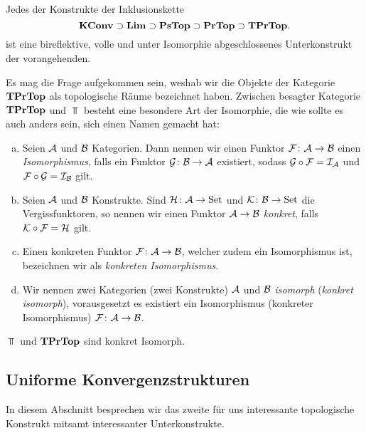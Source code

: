 \begin{prop}
  \label{prop:inklusion}
  Jedes der Konstrukte der Inklusionskette
  $$
  \mathbf{KConv} \supset \mathbf{Lim} \supset \mathbf{PsTop} \supset \mathbf{PrTop} \supset \mathbf{TPrTop}.
  $$
  ist eine bireflektive, volle und unter Isomorphie abgeschlossenes Unterkonstrukt der vorangehenden.
\end{prop}

Es mag die Frage aufgekommen sein, weshab wir die Objekte der Kategorie $\mathbf{TPrTop}$ als topologische Räume bezeichnet haben.
Zwischen besagter Kategorie $\mathbf{TPrTop}$ und $\Top$ besteht eine besondere Art der Isomorphie, die wie sollte es auch anders sein, sich einen Namen gemacht hat:
\begin{defn}
  \begin{enumerate}[a)]
    \item Seien $\mathcal{A}$ und $\mathcal{B}$ Kategorien.
      Dann nennen wir einen Funktor $\mathcal{F} \colon \mathcal{A} \to \mathcal{B}$ einen \emph{Isomorphismus}, falls ein Funktor $\mathcal{G} \colon \mathcal{B} \to \mathcal{A}$ existiert, sodass $\mathcal{G} \circ \mathcal{F} = \mathcal{I}_{\mathcal{A}}$ und $\mathcal{F} \circ \mathcal{G} = \mathcal{I}_{\mathcal{B}}$ gilt.
    \item Seien $\mathcal{A}$ und $\mathcal{B}$ Konstrukte.
      Sind $\mathcal{H} \colon \mathcal{A} \to \mathrm{Set}$ und $\mathcal{K} \colon \mathcal{B} \to \mathrm{Set}$ die Vergissfunktoren, so nennen wir einen Funktor $\mathcal{A} \to \mathcal{B}$ \emph{konkret}, falls $\mathcal{K} \circ \mathcal{F} = \mathcal{H}$ gilt.
    \item Einen konkreten Funktor $\mathcal{F} \colon \mathcal{A} \to \mathcal{B}$, welcher zudem ein Isomorphismus ist, bezeichnen wir als \emph{konkreten Isomorphismus}.
    \item Wir nennen zwei Kategorien (zwei Konstrukte) $\mathcal{A}$ und $\mathcal{B}$ \emph{isomorph} (\emph{konkret isomorph}), vorausgesetzt es existiert ein Isomorphismus (konkreter Isomorphismus) $\mathcal{F} \colon \mathcal{A} \to \mathcal{B}$.
  \end{enumerate}
\end{defn}

\begin{prop}
  $\Top$ und $\mathbf{TPrTop}$ sind konkret Isomorph.
\end{prop}


\subsection{Uniforme Konvergenzstrukturen}

In diesem Abschnitt besprechen wir das zweite für uns interessante topologische Konstrukt mitsamt interessanter Unterkonstrukte.

